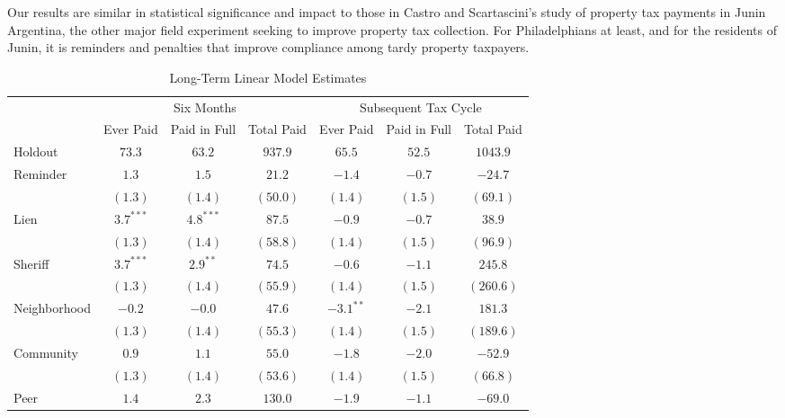 \documentclass[12pt]{article}
\begin{document}
Our results are similar in statistical significance and impact to those in
Castro and Scartascini's \citeyear{castro} study of property tax
payments in Junin Argentina, the other major field experiment seeking
to improve property tax collection.  For Philadelphians at least, and
for the residents of Junin, it is reminders and penalties that improve
compliance among tardy property taxpayers.

\begin{table}[htbp]
\caption{Long-Term Linear Model Estimates}
\begin{center}
\begin{tabular}{l c c c c c c }
\hline
 & \multicolumn{3}{c}{Six Months} & \multicolumn{3}{c}{Subsequent Tax Cycle} \\
 & Ever Paid & Paid in Full & Total Paid & Ever Paid & Paid in Full & Total Paid \\
Holdout      & $73.3$ & $63.2$ & $937.9$ & $65.5$ & $52.5$ & $1043.9$ \\
\hline
Reminder     & $1.3$        & $1.5$        & $21.2$        & $-1.4$       & $-0.7$       & $-24.7$        \\
             & $(1.3)$      & $(1.4)$      & $(50.0)$      & $(1.4)$      & $(1.5)$      & $(69.1)$       \\
Lien         & $3.7^{***}$  & $4.8^{***}$  & $87.5$        & $-0.9$       & $-0.7$       & $38.9$         \\
             & $(1.3)$      & $(1.4)$      & $(58.8)$      & $(1.4)$      & $(1.5)$      & $(96.9)$       \\
Sheriff      & $3.7^{***}$  & $2.9^{**}$   & $74.5$        & $-0.6$       & $-1.1$       & $245.8$        \\
             & $(1.3)$      & $(1.4)$      & $(55.9)$      & $(1.4)$      & $(1.5)$      & $(260.6)$      \\
Neighborhood & $-0.2$       & $-0.0$       & $47.6$        & $-3.1^{**}$  & $-2.1$       & $181.3$        \\
             & $(1.3)$      & $(1.4)$      & $(55.3)$      & $(1.4)$      & $(1.5)$      & $(189.6)$      \\
Community    & $0.9$        & $1.1$        & $55.0$        & $-1.8$       & $-2.0$       & $-52.9$        \\
             & $(1.3)$      & $(1.4)$      & $(53.6)$      & $(1.4)$      & $(1.5)$      & $(66.8)$       \\
Peer         & $1.4$        & $2.3$        & $130.0$       & $-1.9$       & $-1.1$       & $-69.0$        \\

\end{tabular}
\end{center}
\end{table}
\end{document}
